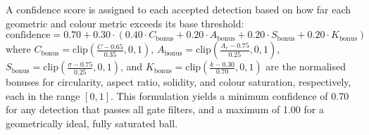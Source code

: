 A confidence score is assigned to each accepted detection based on how far each
geometric and colour metric exceeds its base threshold:
\begin{equation}
    \mathrm{confidence} = 0.70 + 0.30 \cdot (0.40 \cdot C_{\mathrm{bonus}}
    + 0.20 \cdot A_{\mathrm{bonus}} + 0.20 \cdot S_{\mathrm{bonus}}
    + 0.20 \cdot K_{\mathrm{bonus}})
\end{equation}
where
$C_{\mathrm{bonus}} = \mathrm{clip}\!\left(\frac{C - 0.65}{0.35}, 0, 1\right)$,
$A_{\mathrm{bonus}} = \mathrm{clip}\!\left(\frac{A_r - 0.75}{0.25}, 0, 1\right)$,
$S_{\mathrm{bonus}} = \mathrm{clip}\!\left(\frac{\sigma - 0.75}{0.25}, 0, 1\right)$,
and
$K_{\mathrm{bonus}} = \mathrm{clip}\!\left(\frac{k - 0.30}{0.70}, 0, 1\right)$
are the normalised bonuses for circularity, aspect ratio, solidity, and colour
saturation, respectively, each in the range $[0, 1]$. This formulation yields a
minimum confidence of 0.70 for any detection that passes all gate filters, and a
maximum of 1.00 for a geometrically ideal, fully saturated ball.

